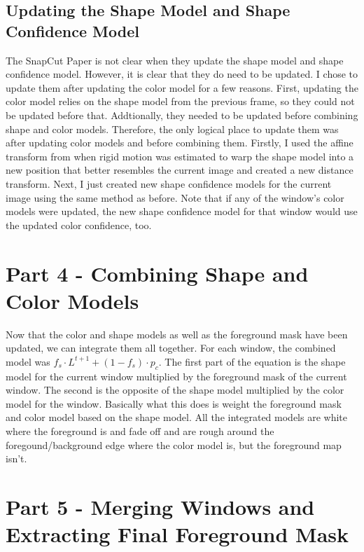 \documentclass[10pt]{article}
\begin{document}
\subsection{Updating the Shape Model and Shape Confidence Model}
The SnapCut Paper is not clear when they update the shape model and shape confidence model. However, it is clear that they do need to be updated. I chose to update them after updating the color model for a few reasons. First, updating the color model relies on the shape model from the previous frame, so they could not be updated before that. Addtionally, they needed to be updated before combining shape and color models. Therefore, the only logical place to update them was after updating color models and before combining them. Firstly, I used the affine transform from when rigid motion was estimated to warp the shape model into a new position that better resembles the current image and created a new distance transform. Next, I just created new shape confidence models for the current image using the same method as before. Note that if any of the window's color models were updated, the new shape confidence model for that window would use the updated color confidence, too.

\section{Part 4 - Combining Shape and Color Models}
Now that the color and shape models as well as the foreground mask have been updated, we can integrate them all together. For each window, the combined model was $f_s \cdot L^{t+1} + (1 - f_s) \cdot p_c$. The first part of the equation is the shape model for the current window multiplied by the foreground mask of the current window. The second is the opposite of the shape model multiplied by the color model for the window. Basically what this does is weight the foreground mask and color model based on the shape model. All the integrated models are white where the foreground is and fade off and are rough around the foregound/background edge where the color model is, but the foreground map isn't.

\section{Part 5 - Merging Windows and Extracting Final Foreground Mask}
\end{document}
